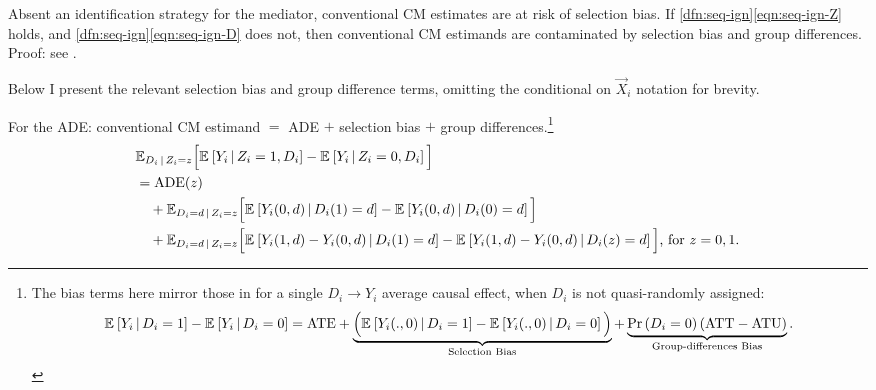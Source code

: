 \begin{theorem}
    \label{thm:selection-bias}
    Absent an identification strategy for the mediator, conventional CM estimates are at risk of selection bias.
    If \ref{dfn:seq-ign}\eqref{eqn:seq-ign-Z} holds, and \ref{dfn:seq-ign}\eqref{eqn:seq-ign-D} does not, then conventional CM estimands are contaminated by selection bias and group differences.
    Proof: see .
\end{theorem}
Below I present the relevant selection bias and group difference terms, omitting the conditional on $\vec X_i$ notation for brevity.

\noindent
For the ADE: conventional CM estimand $=$ ADE $+$ selection bias $+$ group differences.\footnote{
    The bias terms here mirror those in \cite{heckman1998characterizing,angrist2009mostly} for a single $D_i \to Y_i$ average causal effect, when $D_i$ is not quasi-randomly assigned:
    \vspace{-0.25cm}
    \[ \mathbb{E}_{} \left[  Y_i \, \middle\vert \, D_i =1 \right] - \mathbb{E}_{} \left[  Y_i \, \middle\vert \, D_i =0 \right]
        = \text{ATE}
        + \underbrace{\Big( \mathbb{E}_{} \left[  Y_i(.,0) \, \middle\vert \, D_i =1 \right] - \mathbb{E}_{} \left[  Y_i(.,0) \, \middle\vert \, D_i =0 \right] \Big)}_{
            \text{Selection Bias}}
        + \underbrace{ \Pr\left( D_i=0 \right) (\text{ATT} - \text{ATU}) }_{
            \text{Group-differences Bias}}. \]
}
\begin{align*}
    & \mathbb E_{D_i \,\mid\, Z_i=z} \Big[
        \mathbb{E}_{} \left[ Y_i \, \middle\vert \, Z_i=1,D_i \right] - \mathbb{E}_{} \left[ Y_i \, \middle\vert \, Z_i=0,D_i \right] \Big] \\
    &= \text{ADE}(z) \\
    &\quad+
        \mathbb E_{D_i =d\,\mid\, Z_i=z} \Big[
            \mathbb{E}_{} \left[ Y_i(0,d) \, \middle\vert \, D_i(1)=d \right]
            -
            \mathbb{E}_{} \left[ Y_i(0,d) \, \middle\vert \, D_i(0)=d \right] \Big] \\
    &\quad+
        \mathbb E_{D_i =d \,\mid\, Z_i=z} \Big[
            \mathbb{E}_{} \left[ 
                Y_i(1,d)-Y_i(0,d)
             \, \middle\vert \, 
                D_i(1)=d
             \right]
            -
            \mathbb{E}_{} \left[ 
                Y_i(1,d)-Y_i(0,d)
             \, \middle\vert \, 
                D_i(z)=d
             \right] \Big]
    \text{, for } z = 0,1.
\end{align*}


